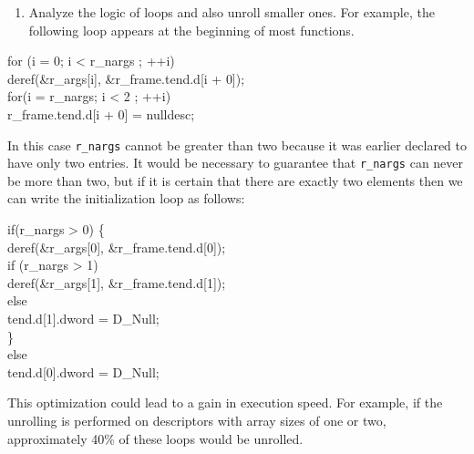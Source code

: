 \liststyleLxxxvii
\begin{enumerate}
\item 
Analyze the logic of loops and also unroll smaller ones. For example,
the following loop appears at the beginning of most functions.
\end{enumerate}
\goodbreak
\begin{iconcode}
for (i = 0; i < r\_nargs ; ++i)\\
\>deref(\&r\_args[i], \&r\_frame.tend.d[i + 0]);\\
for(i = r\_nargs; i < 2 ; ++i)\\
\>r\_frame.tend.d[i + 0] = nulldesc;\\
\end{iconcode}


In this case \texttt{r\_nargs} cannot be greater than two because it
was earlier declared to have only two entries. It would be necessary
to guarantee that \texttt{r\_nargs} can never be more than two, but if
it is certain that there are exactly two elements then we can write
the initialization loop as follows:

\goodbreak
\begin{iconcode}
if(r\_nargs > 0) \{\\
\>deref(\&r\_args[0], \&r\_frame.tend.d[0]);\\
\>if (r\_nargs > 1)\\
\>\>deref(\&r\_args[1], \&r\_frame.tend.d[1]);\\
\>else\\
\>\>tend.d[1].dword = D\_Null;\\
\>\}\\
else\\
\>tend.d[0].dword = D\_Null;\\
\end{iconcode}


This optimization could lead to a gain in execution speed. For
example, if the unrolling is performed on descriptors with array sizes
of one or two, approximately 40\% of these loops would be unrolled.

